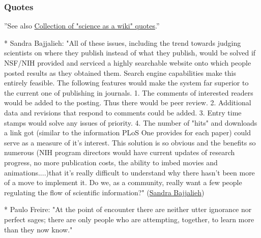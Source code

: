 \documentclass[final,authoryear,3p]{elsarticle-open-drafting}
\begin{document}
\begin{enumerate}
\subsubsection{Quotes}
''See also \href{http://www.science3point0.com/coaspedia/index.php/User:Daniel_Mietchen/Talks/Slides/Quotes}{Collection of "science as a wiki" quotes}.''

* Sandra Bajjalieh: "All of these issues, including the trend towards judging scientists on where they publish instead of what they publish, would be solved if NSF/NIH provided and serviced a highly searchable website onto which people posted results as they obtained them. Search engine capabilities make this entirely feasible. The following features would make the system far superior to the current one of publishing in journals. 1. The comments of interested readers would be added to the posting. Thus there would be peer review. 2. Additional data and revisions that respond to comments could be added. 3. Entry time stamps would solve any issues of priority. 4. The number of "hits" and downloads a link got (similar to the information PLoS One provides for each paper) could serve as a measure of it's interest. This solution is so obvious and the benefits so numerous (NIH program directors would have current updates of research progress, no more publication costs, the ability to imbed movies and animations....)that it's really difficult to understand why there hasn't been more of a move to implement it. Do we, as a community, really want a few people regulating the flow of scientific information?" (\href{http://www.nature.com/news/2011/110427/full/472391a.html}{Sandra Bajjalieh})

* Paulo Freire: "At the point of encounter there are neither utter ignorance nor perfect sages; there are only people who are attempting, together, to learn more than they now know." 


\end{enumerate}
\end{document}

